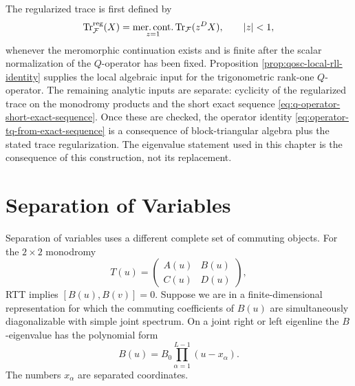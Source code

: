 The regularized trace is first defined by
\[
  \operatorname{Tr}^{\rm reg}_{\mathcal F}(X)
  =
  \operatorname*{mer.cont.}_{z=1}\operatorname{Tr}_{\mathcal F}(z^D X),
  \qquad |z|<1,
\]
whenever the meromorphic continuation exists and is finite after the scalar
normalization of the \(Q\)-operator has been fixed.  Proposition
\ref{prop:qosc-local-rll-identity} supplies the local algebraic input for
the trigonometric rank-one \(Q\)-operator.  The remaining analytic inputs
are separate: cyclicity of the regularized trace on the monodromy products
and the short exact sequence \eqref{eq:q-operator-short-exact-sequence}.
Once these are checked, the operator identity
\eqref{eq:operator-tq-from-exact-sequence} is a consequence of
block-triangular algebra plus the stated trace regularization.  The
eigenvalue statement used in this chapter is the consequence of this
construction, not its replacement.

\section{Separation of Variables}

Separation of variables uses a different complete set of commuting objects.
For the \(2\times2\) monodromy
\[
  T(u)=
  \begin{pmatrix}
    A(u)&B(u)\\
    C(u)&D(u)
  \end{pmatrix},
\]
RTT implies \([B(u),B(v)]=0\).  Suppose we are in a finite-dimensional
representation for which the commuting coefficients of \(B(u)\) are
simultaneously diagonalizable with simple joint spectrum.  On a joint
right or left eigenline the \(B\)-eigenvalue has the polynomial form
\[
  B(u)=B_0\prod_{\alpha=1}^{L-1}(u-x_\alpha).
\]
The numbers \(x_\alpha\) are separated coordinates.

